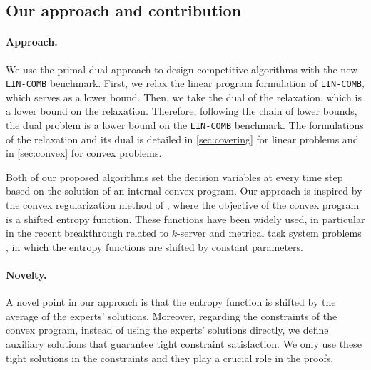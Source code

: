 \subsection{Our approach and contribution}

\paragraph{Approach.} We use the primal-dual approach to design competitive algorithms with the new \texttt{LIN-COMB} benchmark. First, we relax the linear program formulation of \texttt{LIN-COMB}, which serves as a lower bound. Then, we take the dual of the relaxation, which is a lower bound on the relaxation. Therefore, following the chain of lower bounds, the dual problem is a lower bound on the \texttt{LIN-COMB} benchmark. The formulations of the relaxation and its dual is detailed in \cref{sec:covering} for linear problems and in \cref{sec:convex} for convex problems.

Both of our proposed algorithms set the decision variables at every time step based on the solution of an internal convex program. Our approach is inspired by the
convex regularization method of \cite{BuchbinderChen14:Competitive-Analysis}, where the objective of the convex program is a shifted entropy function.
These functions have been widely used, in particular in the recent breakthrough related to $k$-server \cite{BubeckCohen18:K-server-via-multiscale,BuchbinderGupta19:k-servers-with}
and metrical task system problems \cite{BubeckCohen21:Metrical-task},
in which the entropy functions are shifted by constant parameters.

\paragraph{Novelty.} A novel point in our approach is that the entropy function is shifted by the average of the experts' solutions.
Moreover, regarding the constraints of the convex program, instead of using the experts' solutions directly,
we define auxiliary solutions that guarantee tight constraint satisfaction. We only use these tight solutions in the constraints and they play a crucial role in the proofs.

